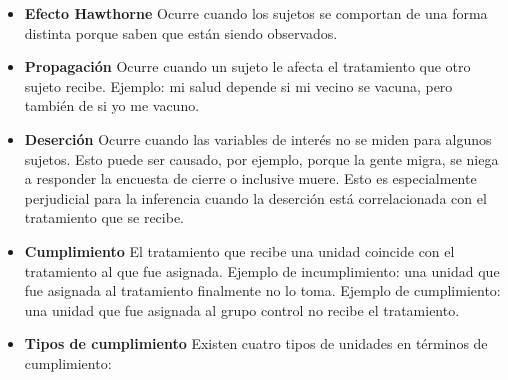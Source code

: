 \documentclass[
  12pt,
  spanish,
]{book}
\providecommand{\tightlist}{%
  \setlength{\itemsep}{0pt}\setlength{\parskip}{0pt}}
\begin{document}
\begin{itemize}
\tightlist
\item
  \textbf{Efecto Hawthorne} Ocurre cuando los sujetos se comportan de una forma distinta porque saben que están siendo observados.
\item
  \textbf{Propagación} Ocurre cuando un sujeto le afecta el tratamiento que otro sujeto recibe.
  Ejemplo: mi salud depende si mi vecino se vacuna, pero también de si yo me vacuno.
\item
  \textbf{Deserción} Ocurre cuando las variables de interés no se miden para algunos sujetos. Esto puede ser causado, por ejemplo, porque la gente migra, se niega a responder la encuesta de cierre o inclusive muere. Esto es especialmente perjudicial para la inferencia cuando la deserción está correlacionada con el tratamiento que se recibe.
\item
  \textbf{Cumplimiento} El tratamiento que recibe una unidad coincide con el tratamiento al que fue asignada. Ejemplo de incumplimiento: una unidad que fue asignada al tratamiento finalmente no lo toma. Ejemplo de cumplimiento: una unidad que fue asignada al grupo control no recibe el tratamiento.
\item
  \textbf{Tipos de cumplimiento} Existen cuatro tipos de unidades en términos de cumplimiento:


\end{itemize}
\end{document}
